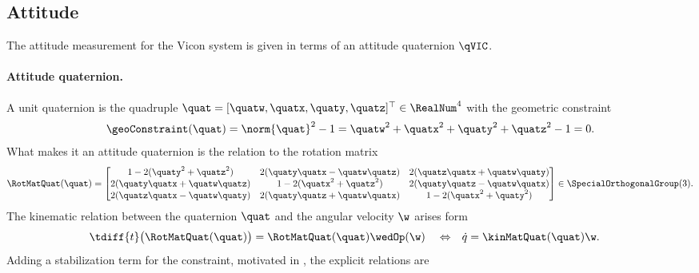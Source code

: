 \subsection{Attitude}
The attitude measurement for the Vicon system is given in terms of an attitude quaternion $\qVIC$.

\paragraph{Attitude quaternion.}
A unit quaternion is the quadruple $\quat = [\quatw, \quatx, \quaty, \quatz]^\top \in \RealNum^4$ with the geometric constraint 
\begin{align}
 \geoConstraint(\quat) = \norm{\quat}^2 - 1 = \quatw^2 + \quatx^2 + \quaty^2 + \quatz^2 - 1 = 0.
\end{align}
What makes it an attitude quaternion is the relation to the rotation matrix
\begin{align}
 \RotMatQuat(\quat) =
 \begin{bmatrix} 
  1 - 2(\quaty^{2} + \quatz^{2}) & 2(\quaty\quatx -\quatw\quatz)  & 2(\quatz\quatx + \quatw\quaty) \\
  2(\quaty\quatx + \quatw\quatz) & 1 - 2(\quatx^{2} + \quatz^{2}) & 2(\quaty\quatz - \quatw\quatx) \\
  2(\quatz\quatx - \quatw\quaty) & 2(\quaty\quatz + \quatw\quatx) & 1 - 2(\quatx^{2} + \quaty^{2})
 \end{bmatrix}
 \in \SpecialOrthogonalGroup(3)
 .
\end{align}
The kinematic relation between the quaternion $\quat$ and the angular velocity $\w$ arises form
\begin{align}
 \tdiff{t} \big( \RotMatQuat(\quat) \big) &= \RotMatQuat(\quat) \wedOp(\w)&
 &\Leftrightarrow&
 \dot{q} &= \kinMatQuat(\quat) \w.
\end{align}
Adding a stabilization term for the constraint, motivated in , the explicit relations are
